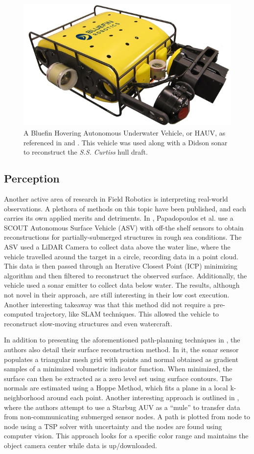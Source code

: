 \documentclass[double,12pt]{beavtex}
\begin{document}
\begin{figure}[h!]
\begin{center}
\includegraphics[width=0.5\columnwidth]{hauv}
\caption{A Bluefin Hovering Autonomous Underwater Vehicle, or HAUV, as referenced in \cite{kim} and \cite{hover}. This vehicle was used along with a Didson sonar to reconstruct the \textit{S.S. Curtiss} hull draft.}
\label{fig:hauv}
\end{center}
\end{figure}

\subsection{Perception}
Another active area of research in Field Robotics is interpreting real-world observations. A plethora of methods on this topic have been published, and each carries its own applied merits and detriments. In \cite{papa}, Papadopoulos et al. use a SCOUT Autonomous Surface Vehicle (ASV) with off-the shelf sensors to obtain reconstructions for partially-submerged structures in rough sea conditions. The ASV used a LiDAR Camera to collect data above the water line, where the vehicle travelled around the target in a circle, recording data in a point cloud. This data is then passed through an Iterative Closest Point (ICP) minimizing algorithm and then filtered to reconstruct the observed surface. Additionally, the vehicle used a sonar emitter to collect data below water. The results, although not novel in their approach, are still interesting in their low cost execution. Another interesting takeaway was that this method did not require a pre-computed trajectory, like SLAM techniques. This allowed the vehicle to reconstruct slow-moving structures and even watercraft. 

In addition to presenting the aforementioned path-planning techniques in \cite{galceran}, the authors also detail their surface reconstruction method. In it, the sonar sensor populates a triangular mesh grid with points and normal obtained as gradient samples of a minimized volumetric indicator function. When minimized, the surface can then be extracted as a zero level set using surface contours. The normals are estimated using a Hoppe Method, which fits a plane in a local k-neighborhood around each point. Another interesting approach is outlined in \cite{dunbabin}, where the authors attempt to use a Starbug AUV as a “mule” to transfer data from non-communicating submerged sensor nodes. A path is plotted from node to node using a TSP solver with uncertainty and the nodes are found using computer vision. This approach looks for a specific color range and maintains the object camera center while data is up/downloaded. 
\end{document}
